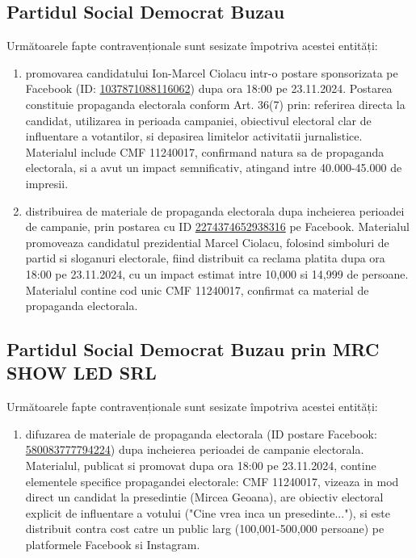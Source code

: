 \documentclass[a4paper,12pt]{article}
\begin{document}
\vspace{0.5cm}

\subsection{Partidul Social Democrat Buzau}
Următoarele fapte contravenționale sunt sesizate împotriva acestei entități:

\begin{enumerate}[leftmargin=*, label=\arabic*.)]
    \item promovarea candidatului Ion-Marcel Ciolacu intr-o postare sponsorizata pe Facebook (ID: \href{https://www.facebook.com/ads/library/?id=1037871088116062}{1037871088116062}) dupa ora 18:00 pe 23.11.2024. Postarea constituie propaganda electorala conform Art. 36(7) prin: referirea directa la candidat, utilizarea in perioada campaniei, obiectivul electoral clar de influentare a votantilor, si depasirea limitelor activitatii jurnalistice. Materialul include CMF 11240017, confirmand natura sa de propaganda electorala, si a avut un impact semnificativ, atingand intre 40.000-45.000 de impresii.
    \item distribuirea de materiale de propaganda electorala dupa incheierea perioadei de campanie, prin postarea cu ID \href{https://www.facebook.com/ads/library/?id=2274374652938316}{2274374652938316} pe Facebook. Materialul promoveaza candidatul prezidential Marcel Ciolacu, folosind simboluri de partid si sloganuri electorale, fiind distribuit ca reclama platita dupa ora 18:00 pe 23.11.2024, cu un impact estimat intre 10,000 si 14,999 de persoane. Materialul contine cod unic CMF 11240017, confirmat ca material de propaganda electorala.
\end{enumerate}

\vspace{0.5cm}

\subsection{Partidul Social Democrat Buzau prin MRC SHOW LED SRL}
Următoarele fapte contravenționale sunt sesizate împotriva acestei entități:

\begin{enumerate}[leftmargin=*, label=\arabic*.)]
    \item difuzarea de materiale de propaganda electorala (ID postare Facebook: \href{https://www.facebook.com/ads/library/?id=580083777794224}{580083777794224}) dupa incheierea perioadei de campanie electorala. Materialul, publicat si promovat dupa ora 18:00 pe 23.11.2024, contine elementele specifice propagandei electorale: CMF 11240017, vizeaza in mod direct un candidat la presedintie (Mircea Geoana), are obiectiv electoral explicit de influentare a votului ("Cine vrea inca un presedinte..."), si este distribuit contra cost catre un public larg (100,001-500,000 persoane) pe platformele Facebook si Instagram.
\end{enumerate}
\end{document}
